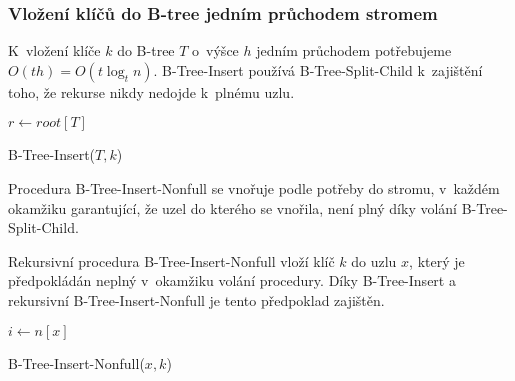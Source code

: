 \subsubsection{Vložení klíčů do B-tree jedním průchodem stromem}

K~vložení klíče $k$ do B-tree $T$ o~výšce $h$ jedním průchodem
potřebujeme $O(th)=O(t\log_{t}n)$\@. B-Tree-Insert používá B-Tree-Split-Child
k~zajištění toho, že rekurse nikdy nedojde k~plnému uzlu\@.

\begin{algorithm}[t]
\SetAlgoLined
{}

$r\longleftarrow root[T]$

\caption{B-Tree-Insert($T,k$)}
\end{algorithm}


Procedura B-Tree-Insert-Nonfull se vnořuje podle potřeby do stromu,
v~každém okamžiku garantující, že uzel do kterého se vnořila, není
plný díky volání B-Tree-Split-Child\@.

Rekursivní procedura B-Tree-Insert-Nonfull vloží klíč $k$ do uzlu
$x$, který je předpokládán neplný v~okamžiku volání procedury\@.
Díky B-Tree-Insert a rekursivní B-Tree-Insert-Nonfull je tento předpoklad
zajištěn\@.

\begin{algorithm}[t]
\SetAlgoLined
{}

$i \longleftarrow n[x]$\\

\caption{B-Tree-Insert-Nonfull($x,k$)}
\end{algorithm}



